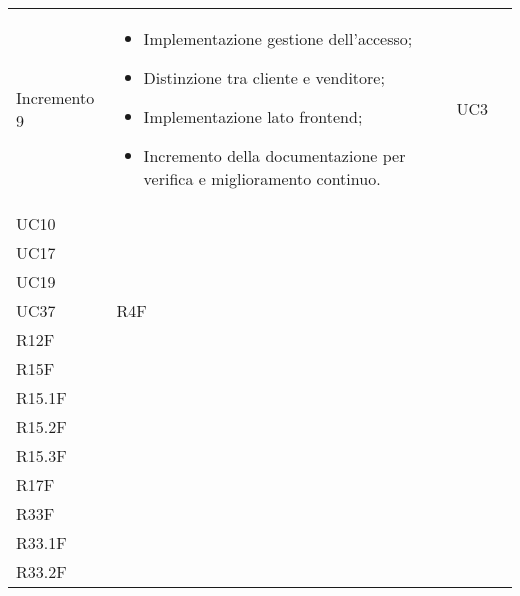 \begin{longtable}{
    >{\centering}p{}
    >{\raggedright}p{}
    >{\centering}p{}
    >{\centering}p{}
    }
    Incremento 9                  &
    \vspace{-15px}
    \begin{itemize}
        \renewcommand\labelitemi{-}
        \item Implementazione gestione dell'accesso;
        \item Distinzione tra cliente e venditore;
        \item Implementazione lato frontend;
        \item Incremento della documentazione per verifica e miglioramento continuo.
    \end{itemize}
                                  & UC3                                                                                            \\ UC10                                                                                                                                                                 \\ UC17                                                                                                                                                                                  \\ UC19  \\ UC37
                                  & R4F                                                                                            \\ R12F \\ R15F                                                                                                                                                                                     \\ R15.1F \\ R15.2F \\ R15.3F \\ R17F \\ R33F \\ R33.1F \\ R33.2F
    \tabularnewline


\end{longtable}
